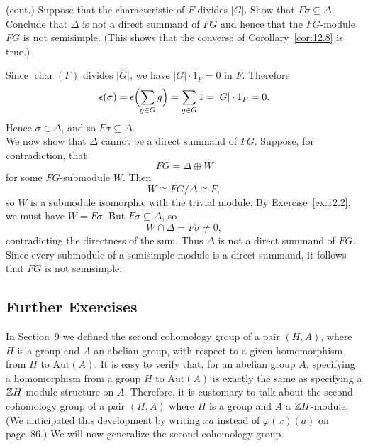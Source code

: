 \documentclass[../Odyssey_Project.tex]{subfiles}
\begin{document}
\begin{exercise}
\label{ex:12.4}
(cont.) Suppose that the characteristic of $F$ divides $|G|$. Show that $F\sigma \subseteq \Delta$. Conclude that $\Delta$ is not a direct summand of $FG$ and hence that the $FG$-module $FG$ is not semisimple. (This shows that the converse of Corollary~\ref{cor:12.8} is true.)
\end{exercise}
\begin{solution}
    Since $\operatorname{char}(F)$ divides $|G|$, we have $|G|\cdot 1_F = 0$ in $F$. Therefore
    \[
        \epsilon(\sigma)
        = \epsilon\Bigl(\sum_{g \in G} g\Bigr)
        = \sum_{g \in G} 1
        = |G|\cdot 1_F
        = 0.
    \]
    Hence $\sigma \in \Delta$, and so $F\sigma \subseteq \Delta$.\\
    We now show that $\Delta$ cannot be a direct summand of $FG$. Suppose, for contradiction, that
    \[
        FG = \Delta \oplus W
    \]
    for some $FG$-submodule $W$. Then
    \[
        W \cong FG/\Delta \cong F,
    \]
    so $W$ is a submodule isomorphic with the trivial module. By Exercise~\ref{ex:12.2}, we must have $W = F\sigma$. But $F\sigma \subseteq \Delta$, so
    \[
        W \cap \Delta = F\sigma \neq 0,
    \]
    contradicting the directness of the sum. Thus $\Delta$ is not a direct summand of $FG$. Since every submodule of a semisimple module is a direct summand, it follows that $FG$ is not semisimple.
\end{solution}

\subsection*{Further Exercises}

In Section~9 we defined the second cohomology group of a pair $(H, A)$, where $H$ is a group and $A$ an abelian group, with respect to a given homomorphism from $H$ to $\mathrm{Aut}(A)$. It is easy to verify that, for an abelian group $A$, specifying a homomorphism from a group $H$ to $\mathrm{Aut}(A)$ is exactly the same as specifying a $\mathbb{Z} H$-module structure on $A$. Therefore, it is customary to talk about the second cohomology group of a pair $(H, A)$ where $H$ is a group and $A$ a $\mathbb{Z} H$-module. (We anticipated this development by writing $xa$ instead of $\varphi(x)(a)$ on page~86.) We will now generalize the second cohomology group.
\end{document}
